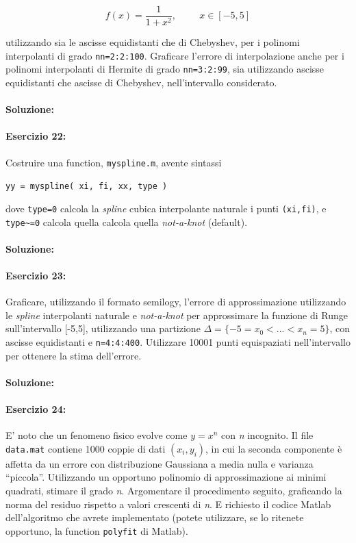 \documentclass[12pt]{article}
\begin{document}
\begin{equation}
    f(x)=\frac{1}{1+x^{2}}, \hspace{1cm} x \in [-5,5]
\end{equation}

utilizzando sia le ascisse equidistanti che di Chebyshev, per i polinomi interpolanti di grado \texttt{nn=2:2:100}.
Graficare l'errore di interpolazione anche per i polinomi interpolanti di Hermite di grado \texttt{nn=3:2:99},
sia utilizzando ascisse equidistanti che ascisse di Chebyshev, nell'intervallo considerato.

\paragraph{Soluzione:}


\paragraph{Esercizio 22:}
Costruire una function, \texttt{myspline.m}, avente sintassi
\begin{center}
\texttt{yy = myspline( xi, fi, xx, type )}
\end{center}
dove \texttt{type=0} calcola la \emph{spline} cubica interpolante naturale i punti \texttt{(xi,fi)}, e \texttt{type\textasciitilde=0} calcola quella calcola quella
\emph{not-a-knot} (default).
\paragraph{Soluzione:}


\paragraph{Esercizio 23:}
Graficare, utilizzando il formato semilogy, l'errore di approssimazione utilizzando le
\emph{spline} interpolanti naturale e \emph{not-a-knot} per approssimare la funzione di Runge sull'intervallo [-5,5],
utilizzando una partizione \(\Delta = \{-5=x_0 <...<x_n=5\}\), con ascisse equidistanti e \texttt{n=4:4:400}.
Utilizzare 10001 punti equispaziati nell'intervallo \text{[-5, 5]} per ottenere la stima dell'errore.

\paragraph{Soluzione:}


\paragraph{Esercizio 24:}
E' noto che un fenomeno fisico evolve come \(y = x^{n}\) con \emph{n} incognito. 
Il file \texttt{data.mat} contiene 1000 coppie di dati \((x_{i},y_{i})\), in cui la seconda componente è affetta da un errore con distribuzione Gaussiana a media nulla e varianza “piccola”. Utilizzando un opportuno polinomio
di approssimazione ai minimi quadrati, stimare il grado \emph{n}. Argomentare il procedimento seguito,
graficando la norma del residuo rispetto a valori crescenti di \emph{n}. E richiesto il codice Matlab dell'algoritmo 
che avrete implementato (potete utilizzare, se lo ritenete opportuno, la function \texttt{polyfit}
di Matlab).
\end{document}
